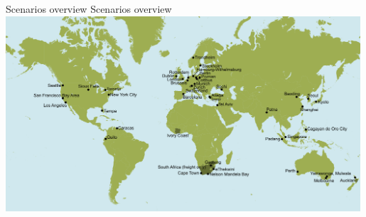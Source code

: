 \createfigure%
{Scenarios overview}%
{Scenarios overview}%
{\label{fig:scenarios}}%
{\includegraphics[width=0.99\textwidth, angle=0]{./scenarios/figures/MATSimModelsMap}}%
{}



%
%
%
%
%

